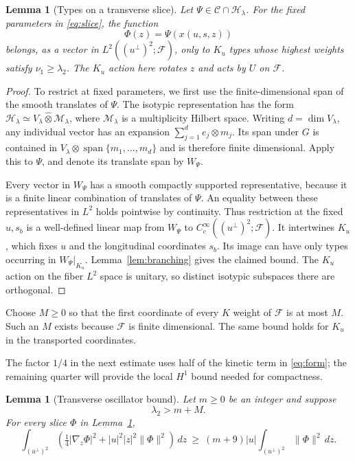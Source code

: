 \documentclass[11pt]{amsart}
\newcommand{\F}{\mathcal F}
\newcommand{\Core}{\mathcal C}
\newcommand{\Hphys}{\mathcal H}
\newcommand{\norm}[1]{\lVert #1\rVert}
\newtheorem{lemma}[theorem]{Lemma}
\theoremstyle{remark}
\numberwithin{equation}{section}
\begin{document}
\begin{lemma}[Types on a transverse slice]
\label{lem:slice}
Let $\Psi\in\Core\cap\Hphys_\lambda$. For the fixed parameters in
\eqref{eq:slice}, the function
\[
 \Phi(z)=\Psi(x(u,s,z))
\]
belongs, as a vector in $L^2((u^\perp)^2;\F)$, only to $K_u$
types whose highest weights satisfy $\nu_1\geq\lambda_2$.
The $K_u$ action here rotates $z$ and acts by $U$ on $\F$.
\end{lemma}

\begin{proof}
To restrict at fixed parameters, we first use the finite-dimensional
span of the smooth translates of $\Psi$.
The isotypic representation has the form
$\Hphys_\lambda\simeq V_\lambda\widehat\otimes\mathcal M_\lambda$,
where $\mathcal M_\lambda$ is a multiplicity Hilbert space. Writing
$d=\dim V_\lambda$, any individual vector has an expansion
$\sum_{j=1}^d e_j\otimes m_j$. Its span under $G$ is contained in
$V_\lambda\otimes\operatorname{span}\{m_1,\ldots,m_d\}$ and is
therefore finite dimensional. Apply this to $\Psi$, and denote its
translate span by $W_\Psi$.

Every vector in $W_\Psi$ has a smooth compactly supported
representative, because it is a finite linear combination of translates
of $\Psi$. An equality between these representatives in $L^2$ holds
pointwise by continuity. Thus restriction at the fixed $u,s_b$ is a
well-defined linear map from $W_\Psi$ to
$C_c^\infty((u^\perp)^2;\F)$. It intertwines $K_u$, which fixes
$u$ and the longitudinal coordinates $s_b$. Its image can have only
types occurring in $W_\Psi|_{K_u}$. Lemma~\ref{lem:branching} gives
the claimed bound. The $K_u$ action on the fiber $L^2$ space is
unitary, so distinct isotypic subspaces there are orthogonal.
\end{proof}

Choose $M\geq0$ so that the first coordinate of every $K$ weight of
$\F$ is at most $M$. Such an $M$ exists because $\F$ is finite
dimensional. The same bound holds for $K_u$ in the transported
coordinates.

The factor $1/4$ in the next estimate uses half of the kinetic term
in \eqref{eq:form}; the remaining quarter will provide the local
$H^1$ bound needed for compactness.

\begin{lemma}[Transverse oscillator bound]
\label{lem:oscillator}
Let $m\geq0$ be an integer and suppose
\begin{equation}
 \lambda_2>m+M.
 \label{eq:large-weight}
\end{equation}
For every slice $\Phi$ in Lemma~\ref{lem:slice},
\begin{equation}
 \int_{(u^\perp)^2}
   \left(\tfrac14|\nabla_z\Phi|^2+|u|^2|z|^2\norm{\Phi}^2\right)\,dz
 \ \geq\ (m+9)|u|\int_{(u^\perp)^2}\norm{\Phi}^2\,dz.
 \label{eq:fiber-oscillator}
\end{equation}
\end{lemma}
\end{document}

